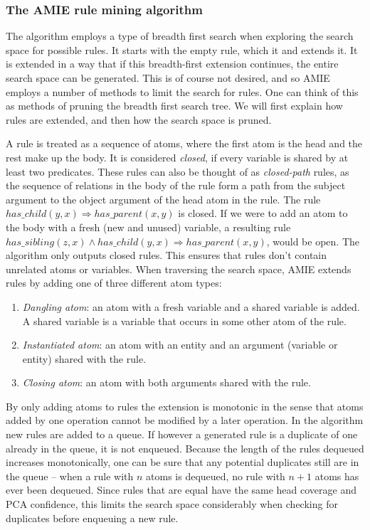 \subsubsection{The AMIE rule mining algorithm}
The algorithm employs a type of breadth first search when exploring the search space for possible rules. It starts with the empty rule, which it and extends it. It is extended in a way that if this breadth-first extension continues, the entire search space can be generated. This is of course not desired, and so AMIE employs a number of methods to limit the search for rules. One can think of this as methods of pruning the breadth first search tree. We will first explain how rules are extended, and then how the search space is pruned.

A rule is treated as a sequence of atoms, where the first atom is the head and the rest make up the body. It is considered \textit{closed}, if every variable is shared by at least two predicates. These rules can also be thought of as \textit{closed-path} rules, as the sequence of relations in the body of the rule form a path from the subject argument to the object argument of the head atom in the rule. The rule $has\_child(y, x) \Rightarrow has\_parent(x, y)$ is closed. If we were to add an atom to the body with a fresh (new and unused) variable, a resulting rule $has\_sibling(z, x) \wedge has\_child(y, x) \Rightarrow has\_parent(x, y)$, would be open. The algorithm only outputs closed rules. This ensures that rules don't contain unrelated atoms or variables. When traversing the search space, AMIE extends rules by adding one of three different atom types:
\begin{enumerate}
    \item \textit{Dangling atom}: an atom with a fresh variable and a shared variable is added. A shared variable is a variable that occurs in some other atom of the rule.
    \item \textit{Instantiated atom}: an atom with an entity and an argument (variable or entity) shared with the rule.
    \item \textit{Closing atom}: an atom with both arguments shared with the rule.
\end{enumerate}

By only adding atoms to rules the extension is monotonic in the sense that atoms added by one operation cannot be modified by a later operation. In the algorithm new rules are added to a queue. If however a generated rule is a duplicate of one already in the queue, it is not enqueued. Because the length of the rules dequeued increases monotonically, one can be sure that any potential duplicates still are in the queue -- when a rule with $n$ atoms is dequeued, no rule with $n+1$ atoms has ever been dequeued. Since rules that are equal have the same head coverage and PCA confidence, this limits the search space considerably when checking for duplicates before enqueuing a new rule.

